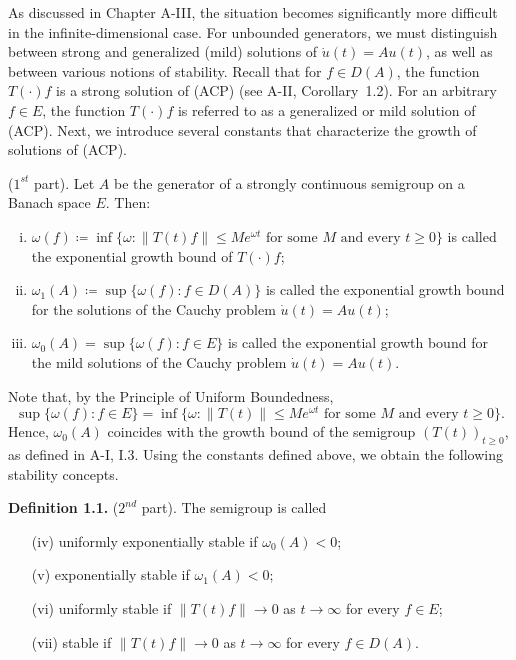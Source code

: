 

As discussed in Chapter A-III, the situation becomes significantly more difficult in the infinite-dimensional case. For unbounded generators, we must distinguish between strong and generalized (mild) solutions of $\dot{u}(t) = Au(t)$, as well as between various notions of stability. 
Recall that for $f \in D(A)$, the function $T(\cdot)f$ is a strong solution of (ACP) (see A-II, Corollary~1.2). 
For an arbitrary $f \in E$, the function $T(\cdot)f$ is referred to as a generalized or mild solution of (ACP). 
Next, we introduce several constants that characterize the growth of solutions of (ACP).

\begin{definition} ($1^{st}$ part).\label{def:a4-1.1}
Let $A$ be the generator of a strongly continuous semigroup on a Banach space $E$. 
Then:
\begin{enumerate}[(i)]
\item $\omega(f) \coloneqq \inf\{\omega : \|T(t)f\| \leq Me^{\omega t} \text{ for some } M \text{ and every } t \geq 0\}$ is called the exponential growth bound of $T(\cdot)f$;
\item $\omega_{1}(A) \coloneqq \sup\{\omega(f) : f \in D(A)\}$ is called the exponential growth bound for the solutions of the Cauchy problem $\dot{u}(t) = Au(t)$;
\item $\omega_0(A) = \sup\{\omega(f) : f \in E\}$ is called the exponential growth bound for the mild solutions of the Cauchy problem $\dot{u}(t) = Au(t)$.
\end{enumerate}
\end{definition}
Note that, by the Principle of Uniform Boundedness, 
\[
\sup\{\omega(f) : f \in E\} = \inf\{\omega : \|T(t)\| \leq Me^{\omega t} \text{ for some } M \text{ and every } t \geq 0\}.
\]
Hence, $\omega_0(A)$ coincides with the growth bound of the semigroup $(T(t))_{t \geq 0}$, as defined in A-I, I.3. 
Using the constants defined above, we obtain the following stability concepts.



{\bf Definition 1.1.} ($2^{nd}$ part). 
The semigroup is called
\begin{enumerate}
\item[(iv)] uniformly exponentially stable if $\omega_0(A) < 0$;
\item[(v)] exponentially stable if $\omega_{1}(A) < 0$;
\item[(vi)] uniformly stable if $\|T(t)f\| \to 0$ as $t \to \infty$ for every $f \in E$;
\item[(vii)] stable if $\|T(t)f\| \to 0$ as $t \to \infty$ for every $f \in D(A)$.
\end{enumerate}


